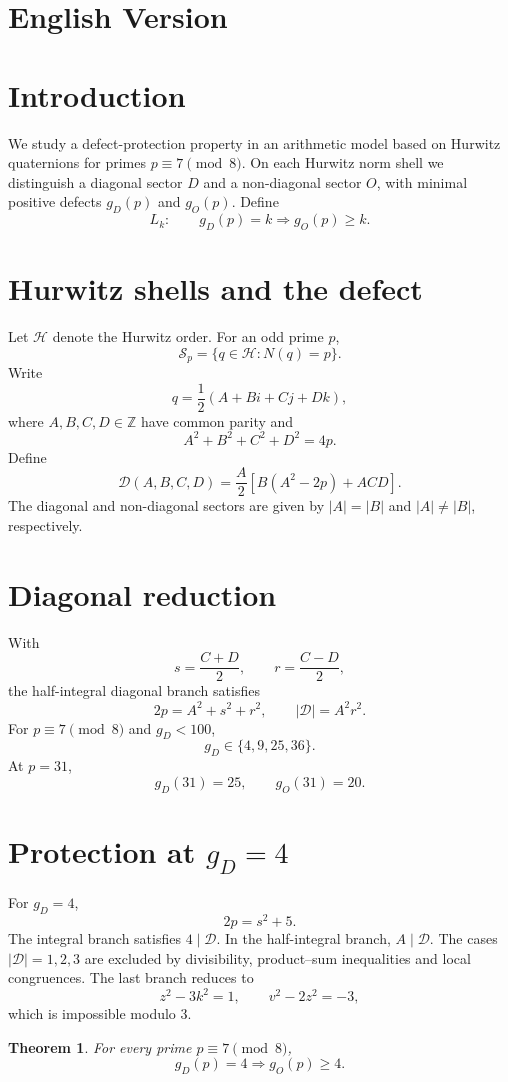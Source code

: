 \documentclass[11pt,a4paper]{article}
\newtheorem{theorem}{Theorem}[section]
\theoremstyle{definition}
\newcommand{\Hur}{\mathcal H}
\newcommand{\Sp}{\mathcal S_p}
\newcommand{\Def}{\mathscr D}
\newcommand{\Z}{\mathbb Z}
\begin{document}
\clearpage
{}
\section*{English Version}

\section{Introduction}
We study a defect-protection property in an arithmetic model based on Hurwitz quaternions for primes \(p\equiv7\pmod8\). On each Hurwitz norm shell we distinguish a diagonal sector \(D\) and a non-diagonal sector \(O\), with minimal positive defects \(g_D(p)\) and \(g_O(p)\). Define
\[
L_k:\qquad g_D(p)=k\Longrightarrow g_O(p)\ge k.
\]

\section{Hurwitz shells and the defect}
Let \(\Hur\) denote the Hurwitz order. For an odd prime \(p\),
\[
\Sp=\{q\in\Hur:N(q)=p\}.
\]
Write
\[
q=\frac12(A+Bi+Cj+Dk),
\]
where \(A,B,C,D\in\Z\) have common parity and
\[
A^2+B^2+C^2+D^2=4p.
\]
Define
\[
\Def(A,B,C,D)=\frac A2\left[B(A^2-2p)+ACD\right].
\]
The diagonal and non-diagonal sectors are given by \(|A|=|B|\) and \(|A|\ne|B|\), respectively.

\section{Diagonal reduction}
With
\[
s=\frac{C+D}{2},\qquad r=\frac{C-D}{2},
\]
the half-integral diagonal branch satisfies
\[
2p=A^2+s^2+r^2,\qquad |\Def|=A^2r^2.
\]
For \(p\equiv7\pmod8\) and \(g_D<100\),
\[
\boxed{g_D\in\{4,9,25,36\}.}
\]
At \(p=31\),
\[
g_D(31)=25,\qquad g_O(31)=20.
\]

\section{Protection at \(g_D=4\)}
For \(g_D=4\),
\[
2p=s^2+5.
\]
The integral branch satisfies \(4\mid\Def\). In the half-integral branch, \(A\mid\Def\). The cases \(|\Def|=1,2,3\) are excluded by divisibility, product--sum inequalities and local congruences. The last branch reduces to
\[
z^2-3k^2=1,\qquad v^2-2z^2=-3,
\]
which is impossible modulo \(3\).

\begin{theorem}
For every prime \(p\equiv7\pmod8\),
\[
\boxed{g_D(p)=4\Longrightarrow g_O(p)\ge4.}
\]
\end{theorem}
\end{document}
